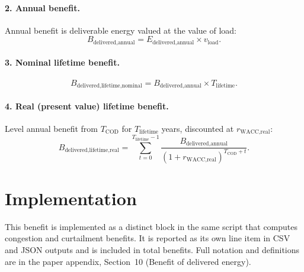 \documentclass[ctcc_full_documentation.tex]{subfiles}
\begin{document}
\paragraph{2. Annual benefit.}
Annual benefit is deliverable energy valued at the value of load:
\begin{equation*}
B_{\text{delivered,annual}} = E_{\text{delivered,annual}} \times v_{\text{load}}.
\end{equation*}

\paragraph{3. Nominal lifetime benefit.}
\begin{equation*}
B_{\text{delivered,lifetime,nominal}} = B_{\text{delivered,annual}} \times T_{\text{lifetime}}.
\end{equation*}

\paragraph{4. Real (present value) lifetime benefit.}
Level annual benefit from $T_{\text{COD}}$ for $T_{\text{lifetime}}$ years, discounted at $r_{\text{WACC,real}}$:
\begin{equation*}
B_{\text{delivered,lifetime,real}} = \sum_{t=0}^{T_{\text{lifetime}}-1} \frac{B_{\text{delivered,annual}}}{(1+r_{\text{WACC,real}})^{T_{\text{COD}}+t}}.
\end{equation*}

\section{Implementation}

This benefit is implemented as a distinct block in the same script that computes congestion and curtailment benefits. It is reported as its own line item in CSV and JSON outputs and is included in total benefits. Full notation and definitions are in the paper appendix, Section~10 (Benefit of delivered energy).
\end{document}

